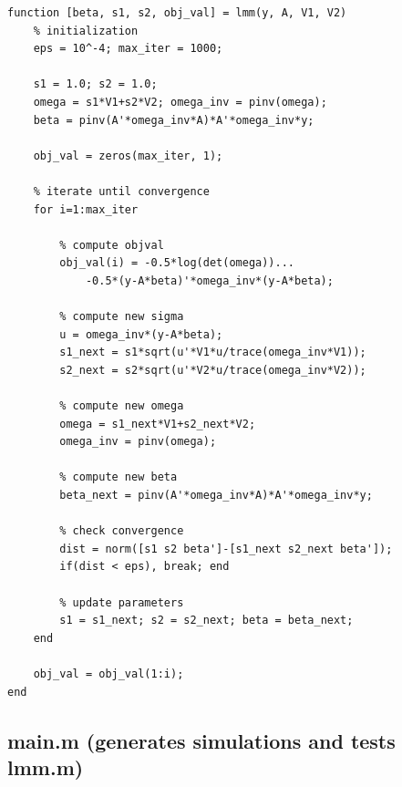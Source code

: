 \documentclass{scrartcl}
\begin{document}
\begin{verbatim}
function [beta, s1, s2, obj_val] = lmm(y, A, V1, V2)
    % initialization
    eps = 10^-4; max_iter = 1000;
    
    s1 = 1.0; s2 = 1.0;
    omega = s1*V1+s2*V2; omega_inv = pinv(omega);
    beta = pinv(A'*omega_inv*A)*A'*omega_inv*y;
    
    obj_val = zeros(max_iter, 1);
    
    % iterate until convergence
    for i=1:max_iter
        
        % compute objval
        obj_val(i) = -0.5*log(det(omega))...
            -0.5*(y-A*beta)'*omega_inv*(y-A*beta);
        
        % compute new sigma
        u = omega_inv*(y-A*beta);
        s1_next = s1*sqrt(u'*V1*u/trace(omega_inv*V1));
        s2_next = s2*sqrt(u'*V2*u/trace(omega_inv*V2));
        
        % compute new omega
        omega = s1_next*V1+s2_next*V2;
        omega_inv = pinv(omega);
        
        % compute new beta
        beta_next = pinv(A'*omega_inv*A)*A'*omega_inv*y;
    
        % check convergence
        dist = norm([s1 s2 beta']-[s1_next s2_next beta']);
        if(dist < eps), break; end
        
        % update parameters
        s1 = s1_next; s2 = s2_next; beta = beta_next;
    end

    obj_val = obj_val(1:i);
end
\end{verbatim}

\subsection*{main.m (generates simulations and tests lmm.m)}
\end{document}
